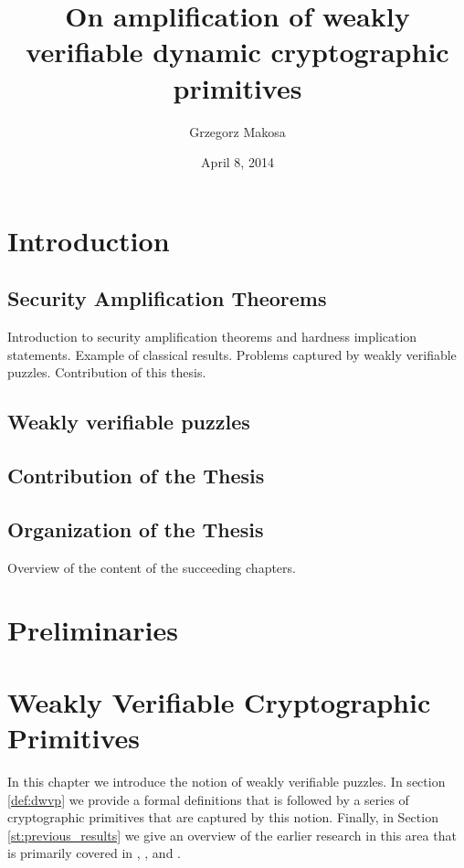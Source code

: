 \documentclass[11pt,a4paper,titlepage]{memoir}
\title{On amplification of weakly verifiable dynamic cryptographic primitives}
\author{Grzegorz Makosa}
\date{April 8, 2014}
\begin{document}
\frontmatter

%

\cleartorecto
\tableofcontents
\mainmatter

\chapter{Introduction}


\section{Security Amplification Theorems}
Introduction to security amplification theorems and hardness implication statements.
Example of classical results. Problems captured by weakly verifiable puzzles.
Contribution of this thesis.
\section{Weakly verifiable puzzles}
\section{Contribution of the Thesis}
\section{Organization of the Thesis}
Overview of the content of the succeeding chapters.

\chapter{Preliminaries}


\chapter{Weakly Verifiable Cryptographic Primitives}
In this chapter we introduce the notion of weakly verifiable puzzles. In section \ref{def:dwvp} we provide a formal definitions that
is followed by a series of cryptographic primitives that are captured by this notion.
Finally, in Section \ref{st:previous_results} we give an overview of the earlier research in this area
that is primarily covered in \cite{canetti2004hardness}, \cite{Dodis:2009:SAI:1530441.1530450}, and \cite{DBLP:journals/corr/abs-1002-3534}.
\end{document}
